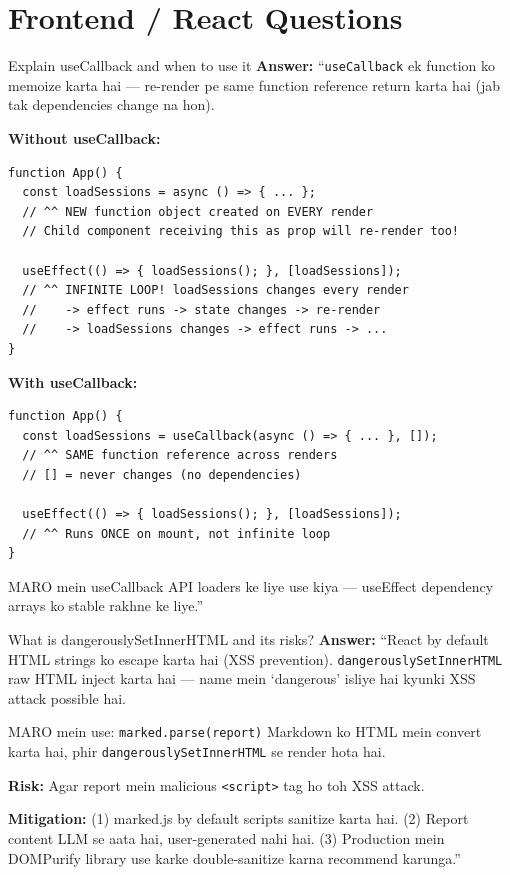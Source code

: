 \documentclass[11pt,a4paper,twoside]{report}
\begin{document}
\section{Frontend / React Questions}

\begin{interviewbox}{Explain useCallback and when to use it}
\textbf{Answer:} ``\texttt{useCallback} ek function ko memoize karta hai --- re-render pe same function reference return karta hai (jab tak dependencies change na hon).

\textbf{Without useCallback:}
\begin{lstlisting}[style=jsstyle]
function App() {
  const loadSessions = async () => { ... };
  // ^^ NEW function object created on EVERY render
  // Child component receiving this as prop will re-render too!

  useEffect(() => { loadSessions(); }, [loadSessions]);
  // ^^ INFINITE LOOP! loadSessions changes every render
  //    -> effect runs -> state changes -> re-render
  //    -> loadSessions changes -> effect runs -> ...
}
\end{lstlisting}

\textbf{With useCallback:}
\begin{lstlisting}[style=jsstyle]
function App() {
  const loadSessions = useCallback(async () => { ... }, []);
  // ^^ SAME function reference across renders
  // [] = never changes (no dependencies)

  useEffect(() => { loadSessions(); }, [loadSessions]);
  // ^^ Runs ONCE on mount, not infinite loop
}
\end{lstlisting}

MARO mein useCallback API loaders ke liye use kiya --- useEffect dependency arrays ko stable rakhne ke liye.''
\end{interviewbox}

\begin{interviewbox}{What is dangerouslySetInnerHTML and its risks?}
\textbf{Answer:} ``React by default HTML strings ko escape karta hai (XSS prevention). \texttt{dangerouslySetInnerHTML} raw HTML inject karta hai --- name mein `dangerous' isliye hai kyunki XSS attack possible hai.

MARO mein use: \texttt{marked.parse(report)} Markdown ko HTML mein convert karta hai, phir \texttt{dangerouslySetInnerHTML} se render hota hai.

\textbf{Risk:} Agar report mein malicious \texttt{<script>} tag ho toh XSS attack.

\textbf{Mitigation:} (1) marked.js by default scripts sanitize karta hai. (2) Report content LLM se aata hai, user-generated nahi hai. (3) Production mein DOMPurify library use karke double-sanitize karna recommend karunga.''
\end{interviewbox}
\end{document}
